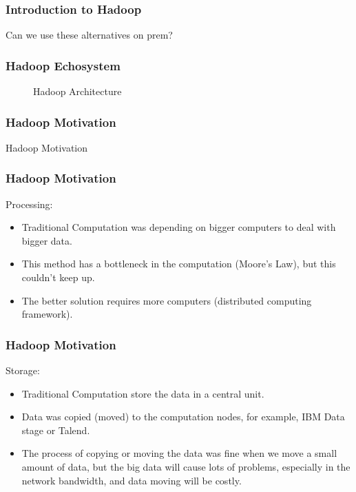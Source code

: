 \begin{frame}[c]{ }
	\frametitle{Introduction to Hadoop }
	\centering     
	
	\textcolor{offgreen}{ \large Can we use these alternatives on prem?}
\end{frame}
\begin{frame}
	\frametitle{Hadoop Echosystem }
	\begin{figure}
	\centering
	
	\caption{Hadoop Architecture } \label{fig:DS3}
\end{figure}
\end{frame}
\begin{frame}[c]{ }
	\frametitle{Hadoop Motivation }
	\centering     
	
	\textcolor{offgreen}{ \large Hadoop Motivation}
\end{frame}
\begin{frame}[c]{ }
	\frametitle{Hadoop Motivation }
	Processing:
	\begin{itemize}  [<+->]
	
	\item Traditional Computation was depending on bigger computers to deal with bigger data.
	\item This method has a bottleneck in the computation (Moore's Law), but this couldn't keep up.
	\item The better solution requires more computers (distributed computing framework).
	
\end{itemize}
\end{frame}
\begin{frame}[c]{ }
	\frametitle{Hadoop Motivation }
	Storage:
	\begin{itemize}  [<+->]
		
		\item Traditional Computation store the data in a central unit.
		\item Data was copied (moved) to the computation nodes, for example, IBM Data stage or Talend.
		\item The process of copying or moving the data was fine when we move a small amount of data, but the big data will cause lots of problems, especially in the network bandwidth, and data moving will be costly.
		
	\end{itemize}
\end{frame}

